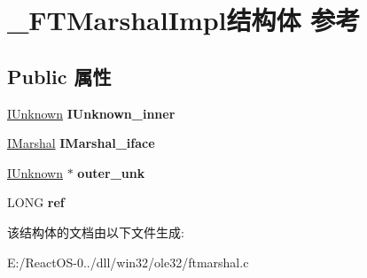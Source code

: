 \hypertarget{struct___f_t_marshal_impl}{}\section{\+\_\+\+F\+T\+Marshal\+Impl结构体 参考}
\label{struct___f_t_marshal_impl}
\subsection*{Public 属性}
\begin{DoxyCompactItemize}
\item 
\mbox{\label{struct___f_t_marshal_impl_ac3389f92471878e942179167c204a0e3}} 
\hyperlink{interface_i_unknown}{I\+Unknown} {\bfseries I\+Unknown\+\_\+inner}
\item 
\mbox{\label{struct___f_t_marshal_impl_aca6d12d18952bea887c2958c5524daf9}} 
\hyperlink{interface_i_marshal}{I\+Marshal} {\bfseries I\+Marshal\+\_\+iface}
\item 
\mbox{\label{struct___f_t_marshal_impl_abc835f7362c55b41ed889c9b88f1bb33}} 
\hyperlink{interface_i_unknown}{I\+Unknown} $\ast$ {\bfseries outer\+\_\+unk}
\item 
\mbox{\label{struct___f_t_marshal_impl_a46804af207bfd944c62476c970153693}} 
L\+O\+NG {\bfseries ref}
\end{DoxyCompactItemize}


该结构体的文档由以下文件生成\+:\begin{DoxyCompactItemize}
\item 
E\+:/\+React\+O\+S-\/0../dll/win32/ole32/ftmarshal.\+c\end{DoxyCompactItemize}
